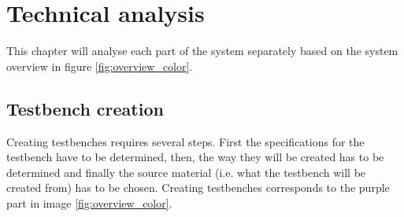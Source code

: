 

\chapter{Technical analysis} \label{TA}
This chapter will analyse each part of the system separately based on the system overview in figure \ref{fig:overview_color}.
\section{Testbench creation}
Creating testbenches requires several steps. First the specifications for the testbench have to be determined, then, the way they will be created has to be determined and finally the source material (i.e. what the testbench will be created from) has to be chosen. Creating testbenches corresponds to the purple part in image \ref{fig:overview_color}.
